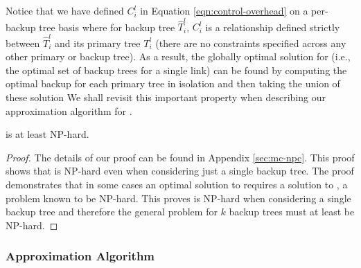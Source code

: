 Notice that we have defined $C^l_i$ in Equation \ref{eqn:control-overhead} on a per-backup tree basis where for backup tree $\hat{T}^l_i$, $C^l_i$ is a relationship defined strictly between 
$\hat{T}^l_i$ and its primary tree $T^l_i$ (there are no constraints specified across any other primary or backup tree). 
As a result, the globally optimal solution for \mc  (i.e., the optimal set of backup trees for a single link)  can be found by computing the optimal backup for each primary tree in isolation
and then taking the union of these solution We shall revisit this important property when describing our approximation algorithm for \mcs.

\begin{theorem}
\label{thm:mc-npc}
\mc is at least NP-hard.
\end{theorem}
\begin{proof}
The details of our proof can be found in Appendix \ref{sec:mc-npc}. This proof shows that \mc is NP-hard even when considering just a single backup tree.  The proof demonstrates that
in some cases an optimal solution to \mc requires a solution to \arbors, a problem known to be NP-hard.  This proves \mc is NP-hard when considering a single backup tree and therefore
the general \mc problem for $k$ backup trees must at least be NP-hard. 
\end{proof}






\subsubsection{\steinern Approximation Algorithm}
\label{subsubsec:steiner-approx}

